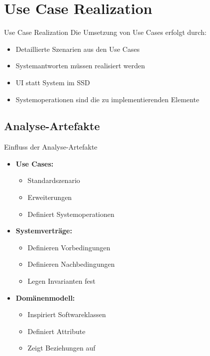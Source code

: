 \section{Use Case Realization}

\begin{concept}{Use Case Realization}
Die Umsetzung von Use Cases erfolgt durch:
\begin{itemize}
    \item Detaillierte Szenarien aus den Use Cases
    \item Systemantworten müssen realisiert werden
    \item UI statt System im SSD
    \item Systemoperationen sind die zu implementierenden Elemente
\end{itemize}
\end{concept}

\subsection{Analyse-Artefakte}

\begin{concept}{Einfluss der Analyse-Artefakte}
\begin{itemize}
    \item \textbf{Use Cases:}
    \begin{itemize}
        \item Standardszenario
        \item Erweiterungen
        \item Definiert Systemoperationen
    \end{itemize}
    \item \textbf{Systemverträge:}
    \begin{itemize}
        \item Definieren Vorbedingungen
        \item Definieren Nachbedingungen
        \item Legen Invarianten fest
    \end{itemize}
    \item \textbf{Domänenmodell:}
    \begin{itemize}
        \item Inspiriert Softwareklassen
        \item Definiert Attribute
        \item Zeigt Beziehungen auf
    \end{itemize}
\end{itemize}
\end{concept}

